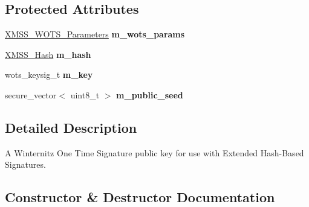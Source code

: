 \subsection*{Protected Attributes}
\begin{DoxyCompactItemize}
\item 
\mbox{\label{class_botan_1_1_x_m_s_s___w_o_t_s___public_key_a11beeb3655746decd959eb4746276d90}} 
\hyperlink{class_botan_1_1_x_m_s_s___w_o_t_s___parameters}{X\+M\+S\+S\+\_\+\+W\+O\+T\+S\+\_\+\+Parameters} {\bfseries m\+\_\+wots\+\_\+params}
\item 
\mbox{\label{class_botan_1_1_x_m_s_s___w_o_t_s___public_key_a9c07ed5994e1acbef9b050e8b09800a6}} 
\hyperlink{class_botan_1_1_x_m_s_s___hash}{X\+M\+S\+S\+\_\+\+Hash} {\bfseries m\+\_\+hash}
\item 
\mbox{\label{class_botan_1_1_x_m_s_s___w_o_t_s___public_key_a09231d6a72a58f807e5de062cf6c5e4e}} 
wots\+\_\+keysig\+\_\+t {\bfseries m\+\_\+key}
\item 
\mbox{\label{class_botan_1_1_x_m_s_s___w_o_t_s___public_key_a411ae75931b2ee99e012987f1255f331}} 
secure\+\_\+vector$<$ uint8\+\_\+t $>$ {\bfseries m\+\_\+public\+\_\+seed}
\end{DoxyCompactItemize}


\subsection{Detailed Description}
A Winternitz One Time Signature public key for use with Extended Hash-\/\+Based Signatures. 

\subsection{Constructor \& Destructor Documentation}
\mbox{\label{class_botan_1_1_x_m_s_s___w_o_t_s___public_key_a7fb721c64c4e4e95d7b253e24942dfe0}} 
